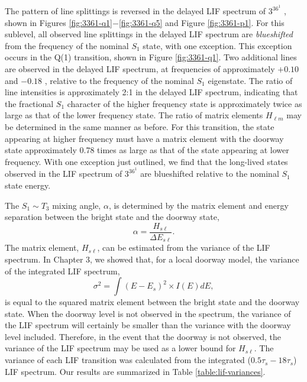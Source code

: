 \documentclass[12pt]{mitthesis}
\begin{document}
The pattern of line splittings is reversed in the delayed LIF spectrum
of $3^36^1$ , shown in Figures
\ref{fig:3361-q1}$-$\ref{fig:3361-q5} and Figure \ref{fig:3361-p1}.
For this sublevel, all observed line splittings in the delayed LIF
spectrum are \emph{blueshifted} from the frequency of the nominal
$S_1$ state, with one exception.  This exception occurs in the Q(1)
transition, shown in Figure \ref{fig:3361-q1}.  Two additional lines
are observed in the delayed LIF spectrum, at frequencies of
approximately $+0.10$ and $-0.18$ \rcm, relative to the frequency of
the nominal $S_1$ eigenstate.  The ratio of line intensities is
approximately 2:1 in the delayed LIF spectrum, indicating that the
fractional $S_1$ character of the higher frequency state is
approximately twice as large as that of the lower frequency state.
The ratio of matrix elements $H_{\ell m}$ may be determined in the
same manner as before.  For this transition, the state appearing at
higher frequency must have a matrix element with the doorway state
approximately 0.78 times as large as that of the state appearing at
lower frequency.  With one exception just outlined, we find that the
long-lived states observed in the LIF spectrum of $3^36^1$  are
blueshifted relative to the nominal $S_1$ state energy.

The $S_1 \sim T_3$ mixing angle, $\alpha$, is determined by the
matrix element and energy separation between the bright state and the
doorway state,
\begin{equation}
  \alpha = \frac{H_{s \ell}}{\Delta E_{s\ell}}.
\end{equation}
The matrix element, $H_{s \ell}$, can be estimated from the variance
of the LIF spectrum.  In Chapter 3, we showed that, for a local
doorway model, the variance of the integrated LIF spectrum,
\begin{equation}
  \label{eq:doorway-var}
  \sigma^2 = \int (E - E_s)^2 \times I(E) dE,
\end{equation}
is equal to the squared matrix element between the bright state and
the doorway state.  When the doorway level is not observed in the
spectrum, the variance of the LIF spectrum will certainly be smaller
than the variance with the doorway level included.  Therefore, in the
event that the doorway is not observed, the variance of the LIF
spectrum may be used as a lower bound for $H_{s \ell}$.  The variance
of each LIF transition was calculated from the integrated
($0.5\tau_s-18\tau_s$) LIF spectrum.  Our results are summarized in
Table \ref{table:lif-variances}.  
\end{document}
